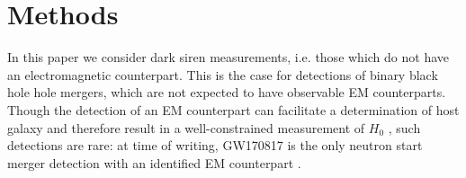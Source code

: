 



\section{\label{sec:methods} Methods}

In this paper we consider dark siren measurements, i.e. those which do not have an electromagnetic counterpart.
This is the case for detections of binary black hole hole mergers, which are not expected to have observable EM counterparts.
Though the detection of an EM counterpart can facilitate a determination of host galaxy and therefore result in a well-constrained measurement of $H_0$ \cite{GW170817_H0}, such detections are rare: at time of writing, GW170817 is the only neutron start merger detection with an identified EM counterpart \cite{GW170817_announce}.

